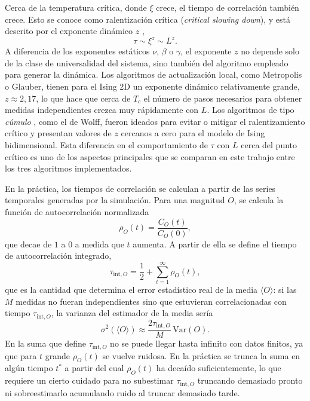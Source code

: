 Cerca de la temperatura crítica, donde $\xi$ crece, el tiempo de correlación también crece. Esto se conoce como ralentización crítica (\textit{critical slowing down}), y está descrito por el exponente dinámico $z$ \citep{HohenbergHalperin1977},
\[
\tau \sim \xi^{z} \sim L^{z}.
\]
A diferencia de los exponentes estáticos $\nu$, $\beta$ o $\gamma$, el exponente $z$ no depende solo de la clase de universalidad del sistema, sino también del algoritmo empleado para generar la dinámica. Los algoritmos de actualización local, como Metropolis o Glauber, tienen para el Ising 2D un exponente dinámico relativamente grande, $z \approx 2{,}17$, lo que hace que cerca de $T_c$ el número de pasos necesarios para obtener medidas independientes crezca muy rápidamente con $L$. Los algoritmos de tipo \textit{cúmulo} \citep{SwendsenWang1987}, como el de Wolff, fueron ideados para evitar o mitigar el ralentizamiento crítico y presentan valores de $z$ cercanos a cero para el modelo de Ising bidimensional. Esta diferencia en el comportamiento de $\tau$ con $L$ cerca del punto crítico es uno de los aspectos principales que se comparan en este trabajo entre los tres algoritmos implementados.

En la práctica, los tiempos de correlación se calculan a partir de las series temporales generadas por la simulación. Para una magnitud $O$, se calcula la función de autocorrelación normalizada
\[
\rho_O(t) = \frac{C_O(t)}{C_O(0)},
\]
que decae de $1$ a $0$ a medida que $t$ aumenta. A partir de ella se define el tiempo de autocorrelación integrado,
\begin{equation} \label{eq:tau_int}
   \tau_{\text{int},O} = \frac{1}{2} + \sum_{t=1}^{\infty} \rho_O(t), 
\end{equation}
que es la cantidad que determina el error estadístico real de la media $\langle O \rangle$: si las $M$ medidas no fueran independientes sino que estuvieran correlacionadas con tiempo $\tau_{\text{int},O}$, la varianza del estimador de la media sería \citep{Wolff2004}
\[
\sigma^2(\langle O \rangle) \approx \frac{2\tau_{\text{int},O}}{M}\,\text{Var}(O).
\]
En la suma que define $\tau_{\text{int},O}$ no se puede llegar hasta infinito con datos finitos, ya que para $t$ grande $\rho_O(t)$ se vuelve ruidosa. En la práctica se trunca la suma en algún tiempo $t^*$ a partir del cual $\rho_O(t)$ ha decaído suficientemente, lo que requiere un cierto cuidado para no subestimar $\tau_{\text{int},O}$ truncando demasiado pronto ni sobreestimarlo acumulando ruido al truncar demasiado tarde.